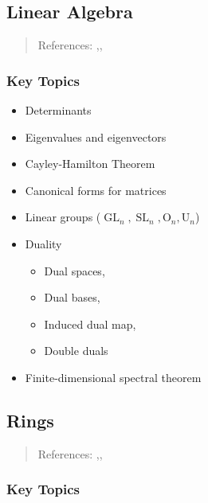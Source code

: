 \hypertarget{linear-algebra}{%
\subsection{Linear Algebra}\label{linear-algebra}}

\begin{quote}
References:
\autocite{dummit_foote_2004},\autocite{hoffman_kunze_1981},\autocite{smith}
\end{quote}

\hypertarget{key-topics-1}{%
\subsubsection{Key Topics}\label{key-topics-1}}

\begin{itemize}
\item
  Determinants
\item
  Eigenvalues and eigenvectors
\item
  Cayley-Hamilton Theorem
\item
  Canonical forms for matrices
\item
  Linear groups
  (\(\operatorname{GL}_n , {\operatorname{SL}}_n, \mathrm{O}_n, \mathrm{U}_n\))
\item
  Duality

  \begin{itemize}
  \tightlist
  \item
    Dual spaces,
  \item
    Dual bases,
  \item
    Induced dual map,
  \item
    Double duals
  \end{itemize}
\item
  Finite-dimensional spectral theorem
\end{itemize}

\hypertarget{rings}{%
\subsection{Rings}\label{rings}}

\begin{quote}
References:
\autocite{dummit_foote_2004},\autocite{hungerford_2008},\autocite{smith}
\end{quote}

\hypertarget{key-topics-2}{%
\subsubsection{Key Topics}\label{key-topics-2}}

